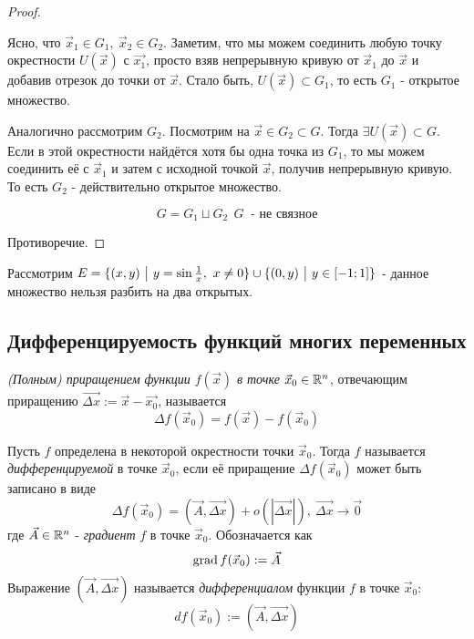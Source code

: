 \begin{proof}
\begin{itemize}
		 Ясно, что $\vec{x}_1 \in G_1,\ \vec{x}_2 \in G_2$. Заметим, что мы можем соединить любую точку окрестности $U(\vec{x})$ с $\vec{x_1}$, просто взяв непрерывную кривую от $\vec{x}_1$ до $\vec{x}$ и добавив отрезок до точки от $\vec{x}$. Стало быть, $U(\vec{x}) \subset G_1$, то есть $G_1$ - открытое множество.
		 
		 Аналогично рассмотрим $G_2$. Посмотрим на  $\vec{x} \in G_2 \subset G$. Тогда $\exists U(\vec{x}) \subset G$. Если в этой окрестности найдётся хотя бы одна точка из $G_1$, то мы можем соединить её с $\vec{x}_1$ и затем с исходной точкой $\vec{x}$, получив непрерывную кривую. То есть $G_2$ - действительно открытое множество.
		 
		 \[
		  G = G_1 \sqcup G_2 \ \ G \ \text{ - не связное}
		 \]
	\end{itemize}
	Противоречие.
\end{proof}

\begin{example}
	Рассмотрим $E = \{(x, y) \ \big|\  y = \sin \frac{1}{x},\ x \neq 0\} \cup \{(0, y) \ \big|\  y \in [-1; 1]\}$ - данное множество нельзя разбить на два открытых.
\end{example}

\subsection{Дифференцируемость функций многих переменных}

\begin{definition}
	\textit{(Полным) приращением функции $f(\vec{x})$ в точке} $\vec{x}_0 \in \mathbb{R}^n$, отвечающим приращению $\overrightarrow{\Delta x} := \vec{x} - \vec{x_0}$, называется
	\[
		\Delta f(\vec{x}_0) = f(\vec{x}) - f(\vec{x}_0)
	\]
\end{definition}

\begin{definition}
	Пусть $f$ определена в некоторой окрестности точки $\vec{x}_0$. Тогда $f$ называется \textit{дифференцируемой} в точке $\vec{x}_0$, если её приращение $\Delta f(\vec{x}_0)$ может быть записано в виде
	\[
		\Delta f(\vec{x}_0) = (\vec{A}, \overrightarrow{\Delta x}) + o(|\overrightarrow{\Delta x}|),\ \overrightarrow{\Delta x} \to \vec{0}
	\]
	где $\vec{A} \in \mathbb{R}^n$ - \textit{градиент} $f$ в точке $\vec{x}_0$. Обозначается как
	\[
		\operatorname{grad} f(\vec{x}_0) := \vec{A}
	\]
	Выражение $(\vec{A}, \overrightarrow{\Delta x})$ называется \textit{дифференциалом} функции $f$ в точке $\vec{x}_0$:
	\[
		df(\vec{x}_0) := (\vec{A}, \overrightarrow{\Delta x})
	\]
\end{definition}

